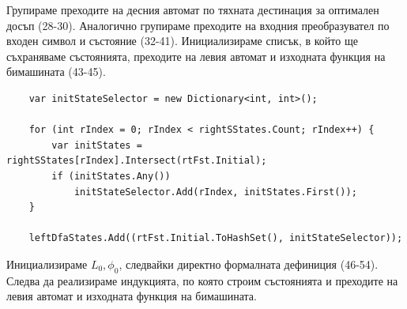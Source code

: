\documentclass[12pt, oneside]{article}
\theoremstyle{definition}
\begin{document}
Групираме преходите на десния автомат по тяхната дестинация за оптимален досъп (28-30). Аналогично групираме преходите на входния преобразувател по входен символ и състояние (32-41). Инициализираме списък, в който ще съхраняваме състоянията, преходите на левия автомат и изходната функция на бимашината (43-45).

\begin{verbatim}
    var initStateSelector = new Dictionary<int, int>();

    for (int rIndex = 0; rIndex < rightSStates.Count; rIndex++) {
        var initStates = rightSStates[rIndex].Intersect(rtFst.Initial);
        if (initStates.Any())
            initStateSelector.Add(rIndex, initStates.First());
    }

    leftDfaStates.Add((rtFst.Initial.ToHashSet(), initStateSelector));
\end{verbatim}

Инициализираме \( L_0, \phi_0 \), следвайки директно формалната дефиниция (46-54). Следва да реализираме индукцията, по която строим състоянията и преходите на левия автомат и изходната функция на бимашината.
\end{document}
